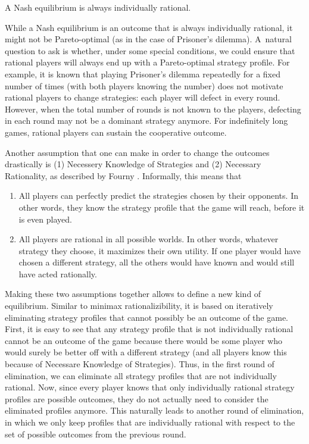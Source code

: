 \begin{observation}
  A Nash equilibrium is always individually rational.
\end{observation}

While a Nash equilibrium is an outcome that is always individually rational, it might not be Pareto-optimal (as in the case of Prisoner's dilemma).
A~natural question to ask is whether, under some special conditions, we could ensure that rational players will always end up with a Pareto-optimal strategy profile.
For example, it is known that playing Prisoner's dilemma repeatedly for a fixed number of times (with both players knowing the number) does not motivate rational players to change strategies: each player will defect in every round.
However, when the total number of rounds is not known to the players, defecting in each round may not be a dominant strategy anymore.
For indefinitely long games, rational players can sustain the cooperative outcome.

Another assumption that one can make in order to change the outcomes drastically is (1) Necessery Knowledge of Strategies and (2) Necessary Rationality, as described by Fourny \cite{Fourny20}.
Informally, this means that
\begin{enumerate}[label=(\arabic*)]
  \item All players can perfectly predict the strategies chosen by their opponents.
  In other words, they know the strategy profile that the game will reach, before it is even played.
  \item All players are rational in all possible worlds.
  In other words, whatever strategy they choose, it maximizes their own utility.
  If one player would have chosen a different strategy, all the others would have known and would still have acted rationally.
\end{enumerate}
Making these two assumptions together allows to define a new kind of equilibrium.
Similar to minimax rationalizibility, it is based on iteratively eliminating strategy profiles that cannot possibly be an outcome of the game.
First, it is easy to see that any strategy profile that is not individually rational cannot be an outcome of the game because there would be some player who would surely be better off with a different strategy (and all players know this because of Necessare Knowledge of Strategies).
Thus, in the first round of elimination, we can eliminate all strategy profiles that are not individually rational.
Now, since every player knows that only individually rational strategy profiles are possible outcomes, they do not actually need to consider the eliminated profiles anymore.
This naturally leads to another round of elimination, in which we only keep profiles that are individually rational with respect to the set of possible outcomes from the previous round.

